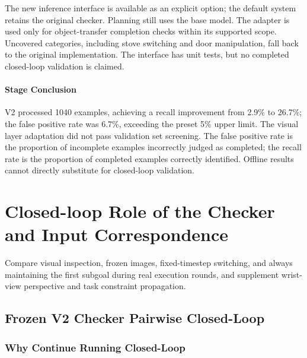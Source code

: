 The new inference interface is available as an explicit option; the default system retains the original checker. Planning still uses the base model. The adapter is used only for object-transfer completion checks within its supported scope. Uncovered categories, including stove switching and door manipulation, fall back to the original implementation. The interface has unit tests, but no completed closed-loop validation is claimed.



\paragraph{Stage Conclusion} V2 processed 1040 examples, achieving a recall improvement from 2.9\% to 26.7\%; the false positive rate was 6.7\%, exceeding the preset 5\% upper limit. The visual layer adaptation did not pass validation set screening. The false positive rate is the proportion of incomplete examples incorrectly judged as completed; the recall rate is the proportion of completed examples correctly identified. Offline results cannot directly substitute for closed-loop validation.


\FloatBarrier

\section{Closed-loop Role of the Checker and Input Correspondence}

\label{stage:s12}

Compare visual inspection, frozen images, fixed-timestep switching, and always maintaining the first subgoal during real execution rounds, and supplement wrist-view perspective and task constraint propagation.

\subsection{Frozen V2 Checker Pairwise Closed-Loop}\label{s12-detail-1}

\subsubsection{Why Continue Running Closed-Loop}\label{s12-detail-2}

